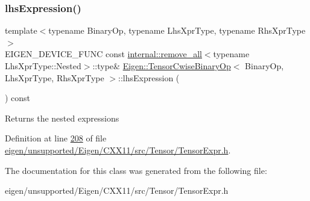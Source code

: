 \mbox{\label{class_eigen_1_1_tensor_cwise_binary_op_abe293a3a1ee663b55c0363d2fb751397}} 
\subsubsection{\texorpdfstring{lhs\+Expression()}{lhsExpression()}\hspace{0.1cm}{\footnotesize\ttfamily [2/2]}}
{\footnotesize\ttfamily template$<$typename Binary\+Op, typename Lhs\+Xpr\+Type, typename Rhs\+Xpr\+Type$>$ \\
E\+I\+G\+E\+N\+\_\+\+D\+E\+V\+I\+C\+E\+\_\+\+F\+U\+NC const \hyperlink{struct_eigen_1_1internal_1_1remove__all}{internal\+::remove\+\_\+all}$<$typename Lhs\+Xpr\+Type\+::\+Nested$>$\+::type\& \hyperlink{class_eigen_1_1_tensor_cwise_binary_op}{Eigen\+::\+Tensor\+Cwise\+Binary\+Op}$<$ Binary\+Op, Lhs\+Xpr\+Type, Rhs\+Xpr\+Type $>$\+::lhs\+Expression (\begin{DoxyParamCaption}{ }\end{DoxyParamCaption}) const\hspace{0.3cm}{\ttfamily [inline]}}

\begin{DoxyReturn}{Returns}
the nested expressions 
\end{DoxyReturn}


Definition at line \hyperlink{eigen_2unsupported_2_eigen_2_c_x_x11_2src_2_tensor_2_tensor_expr_8h_source_l00208}{208} of file \hyperlink{eigen_2unsupported_2_eigen_2_c_x_x11_2src_2_tensor_2_tensor_expr_8h_source}{eigen/unsupported/\+Eigen/\+C\+X\+X11/src/\+Tensor/\+Tensor\+Expr.\+h}.



The documentation for this class was generated from the following file\+:\begin{DoxyCompactItemize}
\item 
eigen/unsupported/\+Eigen/\+C\+X\+X11/src/\+Tensor/\+Tensor\+Expr.\+h\end{DoxyCompactItemize}
